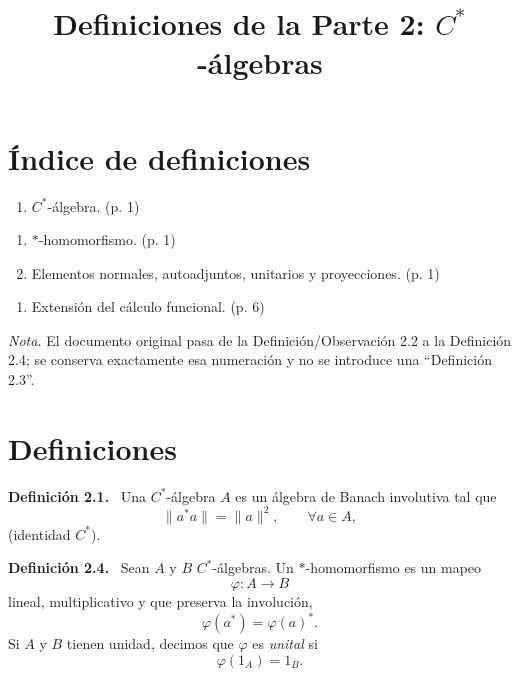 \documentclass[11pt]{article}
\title{Definiciones de la Parte 2: $C^*$-álgebras}
\author{}
\date{}
\newenvironment{definicion}[1]
  {\par\medskip\noindent\textbf{Definición #1.}\ }
  {\par\medskip}
\begin{document}
\maketitle

\section*{Índice de definiciones}
\begin{enumerate}[label=\textbf{Definición 2.\arabic*.},leftmargin=*,start=1]
  \item $C^*$-álgebra. \hfill (p. 1)
\end{enumerate}
\begin{enumerate}[label=\textbf{Definición 2.\arabic*.},leftmargin=*,start=4]
  \item $*$-homomorfismo. \hfill (p. 1)
  \item Elementos normales, autoadjuntos, unitarios y proyecciones. \hfill (p. 1)
\end{enumerate}
\begin{enumerate}[label=\textbf{Definición 2.\arabic*.},leftmargin=*,start=23]
  \item Extensión del cálculo funcional. \hfill (p. 6)
\end{enumerate}

\medskip
\noindent\textit{Nota.} El documento original pasa de la Definición/Observación 2.2 a la Definición 2.4; se conserva exactamente esa numeración y no se introduce una ``Definición 2.3''.

\section*{Definiciones}

\begin{definicion}{2.1}
Una $C^*$-álgebra $A$ es un álgebra de Banach involutiva tal que
\[
  \lVert a^*a\rVert = \lVert a\rVert^2,
  \qquad \forall a\in A,
\]
(identidad $C^*$).
\end{definicion}

\begin{definicion}{2.4}
Sean $A$ y $B$ $C^*$-álgebras. Un $*$-homomorfismo es un mapeo
\[
  \varphi:A\longrightarrow B
\]
lineal, multiplicativo y que preserva la involución,
\[
  \varphi(a^*)=\varphi(a)^*.
\]
Si $A$ y $B$ tienen unidad, decimos que $\varphi$ es \emph{unital} si
\[
  \varphi(1_A)=1_B.
\]
\end{definicion}
\end{document}
